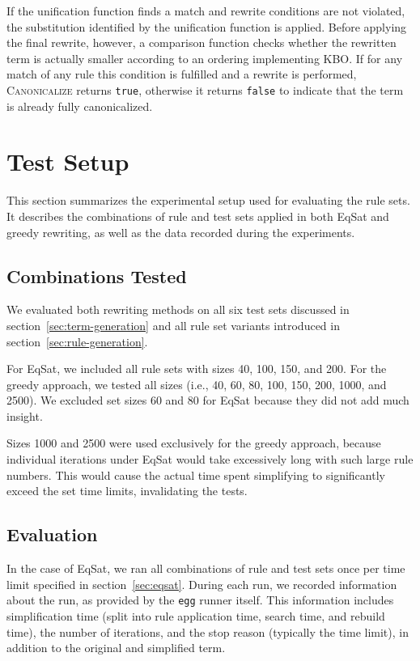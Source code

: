 If the unification function finds a match and rewrite conditions are not violated, the substitution identified by the unification function is applied. Before applying the final rewrite, however, a comparison function checks whether the rewritten term is actually smaller according to an ordering implementing KBO. If for any match of any rule this condition is fulfilled and a rewrite is performed, \textsc{Canonicalize} returns \texttt{true}, otherwise it returns \texttt{false} to indicate that the term is already fully canonicalized.

\section{Test Setup}
\label{sec:test-setup}

This section summarizes the experimental setup used for evaluating the rule sets. It describes the combinations of rule and test sets applied in both EqSat and greedy rewriting, as well as the data recorded during the experiments.

\subsection{Combinations Tested}
We evaluated both rewriting methods on all six test sets discussed in section~\ref{sec:term-generation} and all rule set variants introduced in section~\ref{sec:rule-generation}.

For EqSat, we included all rule sets with sizes 40, 100, 150, and 200. For the greedy approach, we tested all sizes (i.e., 40, 60, 80, 100, 150, 200, 1000, and 2500). We excluded set sizes 60 and 80 for EqSat because they did not add much insight. 

Sizes 1000 and 2500 were used exclusively for the greedy approach, because individual iterations under EqSat would take excessively long with such large rule numbers. This would cause the actual time spent simplifying to significantly exceed the set time limits, invalidating the tests.

\subsection{Evaluation}
In the case of EqSat, we ran all combinations of rule and test sets once per time limit specified in section~\ref{sec:eqsat}. During each run, we recorded information about the run, as provided by the \texttt{egg} runner itself. This information includes simplification time (split into rule application time, search time, and rebuild time), the number of iterations, and the stop reason (typically the time limit), in addition to the original and simplified term. 


